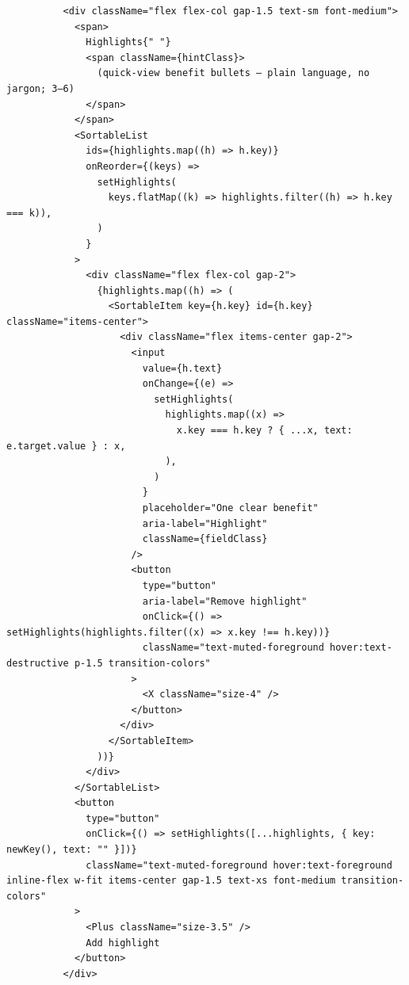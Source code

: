 \documentclass[11pt,a4paper]{article}
\begin{document}
\begin{lstlisting}
          <div className="flex flex-col gap-1.5 text-sm font-medium">
            <span>
              Highlights{" "}
              <span className={hintClass}>
                (quick-view benefit bullets — plain language, no jargon; 3–6)
              </span>
            </span>
            <SortableList
              ids={highlights.map((h) => h.key)}
              onReorder={(keys) =>
                setHighlights(
                  keys.flatMap((k) => highlights.filter((h) => h.key === k)),
                )
              }
            >
              <div className="flex flex-col gap-2">
                {highlights.map((h) => (
                  <SortableItem key={h.key} id={h.key} className="items-center">
                    <div className="flex items-center gap-2">
                      <input
                        value={h.text}
                        onChange={(e) =>
                          setHighlights(
                            highlights.map((x) =>
                              x.key === h.key ? { ...x, text: e.target.value } : x,
                            ),
                          )
                        }
                        placeholder="One clear benefit"
                        aria-label="Highlight"
                        className={fieldClass}
                      />
                      <button
                        type="button"
                        aria-label="Remove highlight"
                        onClick={() => setHighlights(highlights.filter((x) => x.key !== h.key))}
                        className="text-muted-foreground hover:text-destructive p-1.5 transition-colors"
                      >
                        <X className="size-4" />
                      </button>
                    </div>
                  </SortableItem>
                ))}
              </div>
            </SortableList>
            <button
              type="button"
              onClick={() => setHighlights([...highlights, { key: newKey(), text: "" }])}
              className="text-muted-foreground hover:text-foreground inline-flex w-fit items-center gap-1.5 text-xs font-medium transition-colors"
            >
              <Plus className="size-3.5" />
              Add highlight
            </button>
          </div>


\end{lstlisting}
\end{document}
